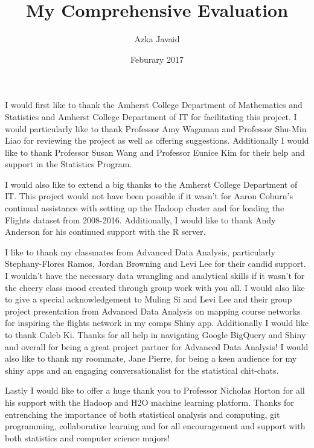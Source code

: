 \documentclass[12pt,twoside]{amherstthesis}
\title{My Comprehensive Evaluation}
\author{Azka Javaid}
\date{Feburary 2017}
\begin{document}
      \maketitle
  
  \frontmatter %
  \pagestyle{empty} %

      \begin{acknowledgements}
      \textbar{} I would first like to thank the Amherst College Department of
      Mathematics and Statistics and Amherst College Department of IT for
      facilitating this project. I would particularly like to thank Professor
      Amy Wagaman and Professor Shu-Min Liao for reviewing the project as well
      as offering suggestions. Additionally I would like to thank Professor
      Susan Wang and Professor Eunice Kim for their help and support in the
      Statistics Program.
      
      I would also like to extend a big thanks to the Amherst College
      Department of IT. This project would not have been possible if it wasn't
      for Aaron Coburn's continual assistance with setting up the Hadoop
      cluster and for loading the Flights dataset from 2008-2016.
      Additionally, I would like to thank Andy Anderson for his continued
      support with the R server.
      
      I like to thank my classmates from Advanced Data Analysis, particularly
      Stephany-Flores Ramos, Jordan Browning and Levi Lee for their candid
      support. I wouldn't have the necessary data wrangling and analytical
      skills if it wasn't for the cheery class mood created through group work
      with you all. I would also like to give a special acknowledgement to
      Muling Si and Levi Lee and their group project presentation from
      Advanced Data Analysis on mapping course networks for inspiring the
      flights network in my comps Shiny app. Additionally I would like to
      thank Caleb Ki. Thanks for all help in navigating Google BigQuery and
      Shiny and overall for being a great project partner for Advanced Data
      Analysis! I would also like to thank my roommate, Jane Pierre, for being
      a keen audience for my shiny apps and an engaging conversationalist for
      the statistical chit-chats.
      
      Lastly I would like to offer a huge thank you to Professor Nicholas
      Horton for all his support with the Hadoop and H2O machine learning
      platform. Thanks for entrenching the importance of both statistical
      analysis and computing, git programming, collaborative learning and for
      all encouragement and support with both statistics and computer science
      majors!
    \end{acknowledgements}
  
\end{document}
